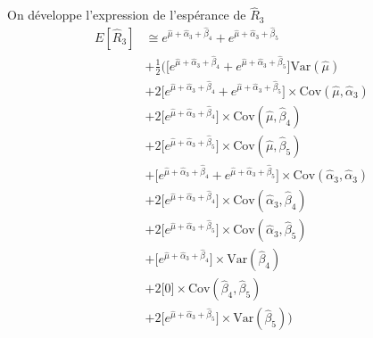 \documentclass[11pt,french]{report}
\begin{document}
On développe l'expression de l'espérance de $\widehat{R}_3$
\begin{align*}
E[\widehat{R}_3] & \cong e^{\widehat{\mu} + \widehat{\alpha}_3 + \widehat{\beta}_4} +  e^{\widehat{\mu} + \widehat{\alpha}_3 + \widehat{\beta}_5} \\
& + \frac{1}{2} \Bigg( \Big[ e^{\widehat{\mu} + \widehat{\alpha}_3 + \widehat{\beta}_4} +  e^{\widehat{\mu} + \widehat{\alpha}_3 + \widehat{\beta}_5} \Big] \text{Var}(\widehat{\mu}) \\
& + 2 \Big[ e^{\widehat{\mu} + \widehat{\alpha}_3 + \widehat{\beta}_4} +  e^{\widehat{\mu} + \widehat{\alpha}_3 + \widehat{\beta}_5} \Big] \times \text{Cov}(\widehat{\mu}, \widehat{\alpha}_3) \\
& + 2 \Big[ e^{\widehat{\mu} + \widehat{\alpha}_3 + \widehat{\beta}_4}  \Big] \times \text{Cov}(\widehat{\mu}, \widehat{\beta}_4)\\
& + 2 \Big[ e^{\widehat{\mu} + \widehat{\alpha}_3 + \widehat{\beta}_5}  \Big] \times \text{Cov}(\widehat{\mu}, \widehat{\beta}_5)\\
& + \Big[ e^{\widehat{\mu} + \widehat{\alpha}_3 + \widehat{\beta}_4} +  e^{\widehat{\mu} + \widehat{\alpha}_3 + \widehat{\beta}_5} \Big] \times \text{Cov}(\widehat{\alpha}_3, \widehat{\alpha}_3) \\
& + 2 \Big[ e^{\widehat{\mu} + \widehat{\alpha}_3 + \widehat{\beta}_4}  \Big] \times \text{Cov}(\widehat{\alpha}_3, \widehat{\beta}_4)\\
& + 2 \Big[ e^{\widehat{\mu} + \widehat{\alpha}_3 + \widehat{\beta}_5}  \Big] \times \text{Cov}(\widehat{\alpha}_3, \widehat{\beta}_5)\\
& + \Big[ e^{\widehat{\mu} + \widehat{\alpha}_3 + \widehat{\beta}_4}  \Big] \times \text{Var}(\widehat{\beta}_4)\\
& + 2 \Big[ 0 \Big] \times \text{Cov}(\widehat{\beta}_4, \widehat{\beta}_5)\\
& + 2 \Big[ e^{\widehat{\mu} + \widehat{\alpha}_3 + \widehat{\beta}_5}  \Big] \times \text{Var}(\widehat{\beta}_5) \Bigg)
\end{align*}
\end{document}
